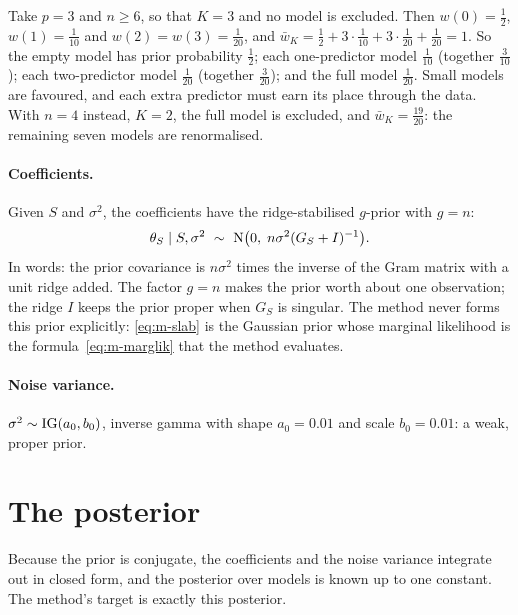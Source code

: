 \documentclass[11pt]{article}
\begin{document}
\begin{example}\label{ex:m-prior}
Take $p=3$ and $n\ge6$, so that $K=3$ and no model is excluded. Then $w(0)=\tfrac12$, $w(1)=\tfrac1{10}$ and
$w(2)=w(3)=\tfrac1{20}$, and $\bar w_K=\tfrac12+3\cdot\tfrac1{10}+3\cdot\tfrac1{20}+\tfrac1{20}=1$. So the empty model has
prior probability $\tfrac12$; each one-predictor model $\tfrac1{10}$ (together $\tfrac3{10}$); each two-predictor model
$\tfrac1{20}$ (together $\tfrac3{20}$); and the full model $\tfrac1{20}$. Small models are favoured, and each extra
predictor must earn its place through the data. With $n=4$ instead, $K=2$, the full model is excluded, and
$\bar w_K=\tfrac{19}{20}$: the remaining seven models are renormalised.
\end{example}

\paragraph{Coefficients.} Given $S$ and $\sigma^2$, the coefficients have the ridge-stabilised $g$-prior
\citep{Zellner1986} with $g=n$:
\begin{equation}\label{eq:m-slab}
  \theta_S\mid S,\sigma^2\ \sim\ \Normal\big(0,\;n\sigma^2(G_S+I)^{-1}\big).
\end{equation}
In words: the prior covariance is $n\sigma^2$ times the inverse of the Gram matrix with a unit ridge added. The factor
$g=n$ makes the prior worth about one observation; the ridge $I$ keeps the prior proper when $G_S$ is singular. The method
never forms this prior explicitly: \eqref{eq:m-slab} is the Gaussian prior whose marginal likelihood is the
formula~\eqref{eq:m-marglik} that the method evaluates.

\paragraph{Noise variance.} $\sigma^2\sim\mathrm{IG}(a_0,b_0)$, inverse gamma with shape $a_0=0.01$ and scale $b_0=0.01$: a weak,
proper prior.

\section{The posterior}\label{sec:m-posterior}

Because the prior is conjugate, the coefficients and the noise variance integrate out in closed form, and the posterior
over models is known up to one constant. The method's target is exactly this posterior.
\end{document}
